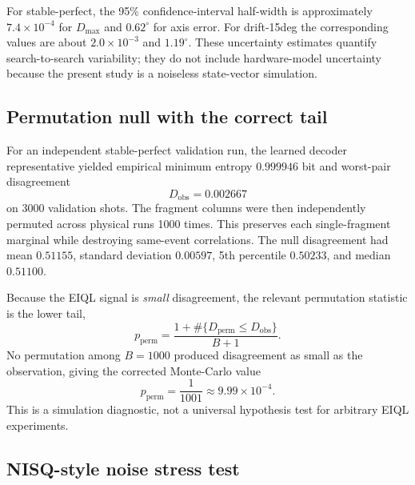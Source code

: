 For stable-perfect, the 95\% confidence-interval half-width is approximately $7.4\times10^{-4}$ for $D_{\max}$ and $0.62^\circ$ for axis error. For drift-15deg the corresponding values are about $2.0\times10^{-3}$ and $1.19^\circ$. These uncertainty estimates quantify search-to-search variability; they do not include hardware-model uncertainty because the present study is a noiseless state-vector simulation.

\subsection{Permutation null with the correct tail}

For an independent stable-perfect validation run, the learned decoder representative yielded empirical minimum entropy $0.999946$ bit and worst-pair disagreement
\[
D_{\mathrm{obs}}=0.002667
\]
on 3000 validation shots. The fragment columns were then independently permuted across physical runs 1000 times. This preserves each single-fragment marginal while destroying same-event correlations. The null disagreement had mean $0.51155$, standard deviation $0.00597$, 5th percentile $0.50233$, and median $0.51100$.

Because the EIQL signal is \emph{small} disagreement, the relevant permutation statistic is the lower tail,
\begin{equation}
p_{\mathrm{perm}}=
\frac{1+\#\{D_{\mathrm{perm}}\le D_{\mathrm{obs}}\}}{B+1}.
\label{eq:permp}
\end{equation}
No permutation among $B=1000$ produced disagreement as small as the observation, giving the corrected Monte-Carlo value
\[
p_{\mathrm{perm}}=\frac{1}{1001}\approx9.99\times10^{-4}.
\]
This is a simulation diagnostic, not a universal hypothesis test for arbitrary EIQL experiments.

\subsection{NISQ-style noise stress test}

